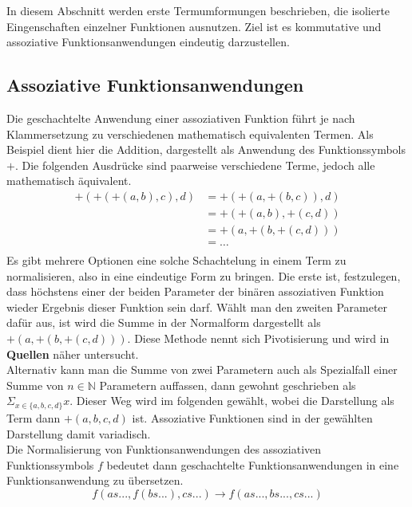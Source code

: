 \documentclass{article}
\begin{document}
In diesem Abschnitt werden erste Termumformungen beschrieben, die isolierte Eingenschaften einzelner Funktionen ausnutzen. Ziel ist es kommutative und assoziative Funktionsanwendungen eindeutig darzustellen.\\

\subsection {Assoziative Funktionsanwendungen}
Die geschachtelte Anwendung einer assoziativen Funktion führt je nach Klammersetzung zu verschiedenen mathematisch equivalenten Termen. Als Beispiel dient hier die Addition, dargestellt als Anwendung des Funktionssymbols $+$. Die folgenden Ausdrücke sind paarweise verschiedene Terme, jedoch alle mathematisch äquivalent.
\begin{equation*}
	\begin{split}
	+(+(+(a, b), c), d) &= +(+(a, +(b, c)), d)\\
	&= +(+(a, b), +(c, d))\\
	&= +(a, +(b, +(c, d)))\\
	&= \dots \\
	\end{split}
\end{equation*}
Es gibt mehrere Optionen eine solche Schachtelung in einem Term zu normalisieren, also in eine eindeutige Form zu bringen. Die erste ist, festzulegen, dass höchstens einer der beiden Parameter der binären assoziativen Funktion wieder Ergebnis dieser Funktion sein darf. Wählt man den zweiten Parameter dafür aus, ist wird die Summe in der Normalform dargestellt als $+(a, +(b, +(c, d)))$. Diese Methode nennt sich Pivotisierung und wird in \textbf{Quellen} näher untersucht.\\
Alternativ kann man die Summe von zwei Parametern auch als Spezialfall einer Summe von $n \in \mathbb{N}$ Parametern auffassen, dann gewohnt geschrieben als $\Sigma_{x \in \{a, b, c, d\}} x$. Dieser Weg wird im folgenden gewählt, wobei die Darstellung als Term dann $+(a, b, c, d)$ ist. Assoziative Funktionen sind in der gewählten Darstellung damit variadisch. \\
Die Normalisierung von Funktionsanwendungen des assoziativen Funktionssymbols $f$ bedeutet dann geschachtelte Funktionsanwendungen in eine Funktionsanwendung zu übersetzen. 
$$f(as..., f(bs...), cs...) \rightarrow f(as..., bs..., cs...)$$
\end{document}
